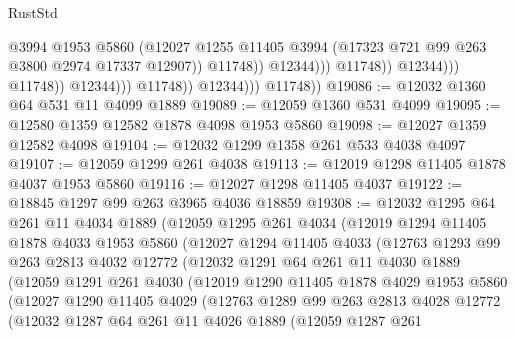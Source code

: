 \begin{lexlean}{RustStd}
\begin{coremodule}
                                                @3994
                                                @1953
                                                @5860
                                                (@12027
                                                  @1255
                                                  @11405
                                                  @3994
                                                  (@17323 @721 @99 @263 @3800 @2974 @17337 @12907))
                                                @11748))
                                            @12344)))
                                      @11748))
                                  @12344)))
                            @11748))
                        @12344)))
                  @11748))
              @12344)))
        @11748))
@19086 := @12032 @1360 @64 @531 @11 @4099 @1889
@19089 := @12059 @1360 @531 @4099
@19095 := @12580 @1359 @12582 @1878 @4098 @1953 @5860
@19098 := @12027 @1359 @12582 @4098
@19104 := @12032 @1299 @1358 @261 @533 @4038 @4097
@19107 := @12059 @1299 @261 @4038
@19113 := @12019 @1298 @11405 @1878 @4037 @1953 @5860
@19116 := @12027 @1298 @11405 @4037
@19122 := @18845 @1297 @99 @263 @3965 @4036 @18859
@19308 := @12032
    @1295
    @64
    @261
    @11
    @4034
    @1889
    (@12059
      @1295
      @261
      @4034
      (@12019
        @1294
        @11405
        @1878
        @4033
        @1953
        @5860
        (@12027
          @1294
          @11405
          @4033
          (@12763
            @1293
            @99
            @263
            @2813
            @4032
            @12772
            (@12032
              @1291
              @64
              @261
              @11
              @4030
              @1889
              (@12059
                @1291
                @261
                @4030
                (@12019
                  @1290
                  @11405
                  @1878
                  @4029
                  @1953
                  @5860
                  (@12027
                    @1290
                    @11405
                    @4029
                    (@12763
                      @1289
                      @99
                      @263
                      @2813
                      @4028
                      @12772
                      (@12032
                        @1287
                        @64
                        @261
                        @11
                        @4026
                        @1889
                        (@12059
                          @1287
                          @261

\end{coremodule}
\end{lexlean}
